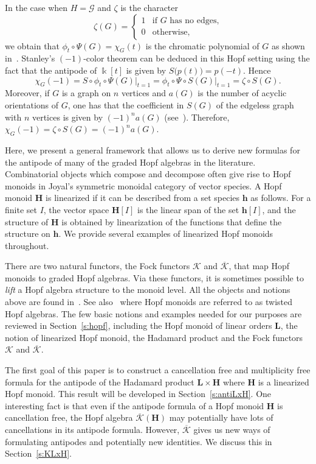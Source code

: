 \documentclass[ALCO,ThmDefs,Unicode,epreuves]{cedram}
\def\field{\Bbbk}
\newcommand{\bL}{\mathbf{L}}
\newcommand{\bH}{\mathbf{H}}
\newcommand{\bh}{\mathbf{h}}
\newcommand{\Kc}{\mathcal{K}}
\newcommand{\Kcb}{\overline{\Kc}}
\begin{document}
In the case when $H=\mathcal{G}$ and $\zeta$ is the character
 $$\zeta(G)=\begin{cases}
 1&\text{if $G$ has no edges,}\\
 0&\text{otherwise,}
 \end{cases}$$
we obtain that $\phi_t\circ \Psi(G)=\chi_G(t)$ is the chromatic polynomial of $G$ as shown in~\cite[Example~4.5]{ABS}.
Stanley's $(-1)$-color theorem can be deduced in this Hopf setting using the fact that the antipode of $\field [t]$ is given by $S\big(p(t)\big)=p(-t)$. Hence
 $$\chi_G(-1)=S\circ\phi_t\circ \Psi(G)\Big|_{t=1} = \phi_t\circ \Psi\circ S(G)\Big|_{t=1}=\zeta\circ S(G).$$
 Moreover, if $G$ is a graph on $n$ vertices and $a(G)$ is the number of acyclic orientations of $G$, one has that the coefficient in $S(G)$ of the edgeless graph with $n$ vertices is given by $(-1)^{n}a(G)$ (see~\cite{Aguiar-Ardila,Benedetti-Sagan,Humpert-Martin}). Therefore, $\chi_G(-1)=\zeta\circ S(G)=(-1)^{n}a(G)$.

Here, we present a general framework that allows us to derive new formulas for the antipode of many of the graded Hopf algebras in the literature. 
Combinatorial objects which compose and decompose often give rise
to Hopf monoids in Joyal's symmetric monoidal category of vector species. A Hopf monoid $\bH$ is linearized if it can be described from a set species $\bh$ as follows. For a finite set $I$, the vector space $\bH[I]$ is the linear span of the set $\bh[I]$, and the structure of $\bH$ is obtained by
linearization of the functions that define the structure on $\bh$. We provide several examples of linearized Hopf monoids throughout.

There are two natural functors, the Fock functors $\mathcal{K}$ and $\overline{\mathcal{K}}$,
that map Hopf monoids to graded Hopf algebras. 
Via these functors, it is sometimes possible to \emph{lift} a Hopf algebra structure to the monoid level.
All the objects and notions above are found in~\cite{AM:2010}. See also~\cite{PR:2004} where Hopf monoids are referred to as twisted Hopf algebras.
The few basic notions and examples needed for our purposes are reviewed in
Section~\ref{s:hopf}, including the Hopf monoid of linear orders $\bL$, the notion of linearized Hopf monoid, the Hadamard product and the Fock functors $\mathcal{K}$ and $\overline{\mathcal{K}}$.

The first goal of this paper is to construct a cancellation free and multiplicity free formula for
the antipode of the Hadamard product $\bL\times\bH$ where $\bH$ is a linearized Hopf monoid. 
This result will be developed in Section~\ref{s:antiLxH}. One interesting fact is that even if the antipode formula of a Hopf monoid $\bH$ is cancellation free, the Hopf algebra $\Kcb(\bH)$ may potentially have lots of cancellations in its antipode formula.
However, $\Kcb$ gives us new ways of formulating antipodes and potentially new identities.
We discuss this in Section~\ref{s:KLxH}.
\end{document}
